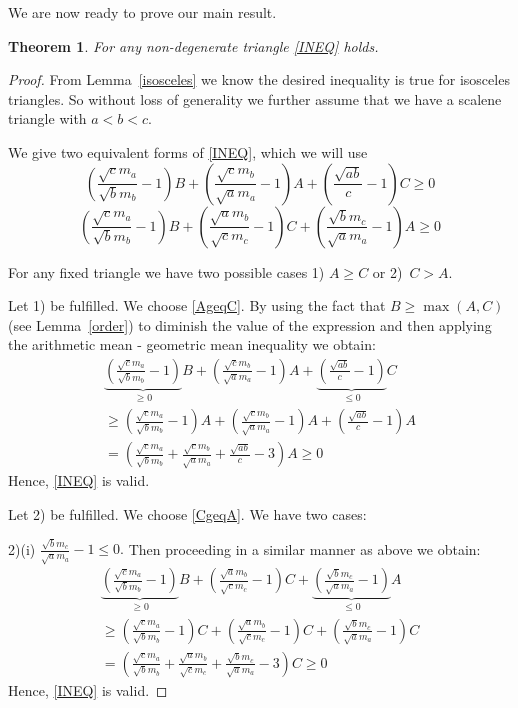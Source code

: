 \documentclass[a4paper,12pt]{article}
\newtheorem{theorem}{Theorem}
\begin{document}
We are now ready to prove our main result.
\begin{theorem}\label{scalenetriag} For any non-degenerate triangle \eqref{INEQ} holds.
\end{theorem}
\begin{proof}
From Lemma~\ref{isosceles} we know the desired inequality is true for isosceles triangles. So without loss of generality we further assume that we have a scalene triangle with $a<b<c.$

We give two equivalent forms of \eqref{INEQ}, which we will use 
\begin{equation}\label{AgeqC}
\left(\frac{\sqrt{c}m_a}{\sqrt{b}m_b}-1\right)B+\left(\frac{\sqrt{c}m_b}{\sqrt{a}m_a}-1\right)A+\left(\frac{\sqrt{ab}}{c}-1\right)C \geq 0
\end{equation}
\begin{equation}\label{CgeqA}
\left(\frac{\sqrt{c}m_a}{\sqrt{b}m_b}-1\right)B+\left(\frac{\sqrt{a}m_b}{\sqrt{c}m_c}-1\right)C+\left(\frac{\sqrt{b}m_c}{\sqrt{a}m_a}-1\right)A \geq 0
\end{equation}

For any fixed triangle we have two possible cases 1) $A \geq C$ or 2)~$C >A.$

Let 1) be fulfilled. We choose \eqref{AgeqC}. By using the fact that $B \geq \max(A,C)$ (see Lemma~\ref{order}) to diminish the value of the expression and then applying the arithmetic mean - geometric mean inequality we obtain:
\begin{align*}
\underbrace{\left(\frac{\sqrt{c}m_a}{\sqrt{b}m_b}-1\right)}_{\geq 0} B+\left(\frac{\sqrt{c}m_b}{\sqrt{a}m_a}-1\right)A+\underbrace{\left(\frac{\sqrt{ab}}{c}-1\right)}_{\leq 0}C\\
\geq \left(\frac{\sqrt{c}m_a}{\sqrt{b}m_b}-1\right)A+\left(\frac{\sqrt{c}m_b}{\sqrt{a}m_a}-1\right)A+\left(\frac{\sqrt{ab}}{c}-1\right)A \\
= \left(\frac{\sqrt{c}m_a}{\sqrt{b}m_b}+\frac{\sqrt{c}m_b}{\sqrt{a}m_a}+ \frac{\sqrt{ab}}{{c} }    -3\right)A \geq 0
\end{align*}
Hence, \eqref{INEQ} is valid.



Let 2) be fulfilled. We choose \eqref{CgeqA}. We have two cases:

2)(i) $\frac{\sqrt{b}m_c}{\sqrt{a}m_a}-1 \leq 0.$ Then proceeding in a similar manner as above we obtain:
\begin{align*}
\underbrace{\left(\frac{\sqrt{c}m_a}{\sqrt{b}m_b}-1\right)}_{\geq 0} B+\left(\frac{\sqrt{a}m_b}{\sqrt{c}m_c}-1\right)C+\underbrace{\left(\frac{\sqrt{b}m_c}{\sqrt{a}m_a}-1\right)}_{\leq 0}A\\
\geq \left(\frac{\sqrt{c}m_a}{\sqrt{b}m_b}-1\right)C+\left(\frac{\sqrt{a}m_b}{\sqrt{c}m_c}-1\right)C+\left(\frac{\sqrt{b}m_c}{\sqrt{a}m_a}-1\right)C\\
= \left(\frac{\sqrt{c}m_a}{\sqrt{b}m_b} + \frac{\sqrt{a}m_b}{\sqrt{c}m_c} +\frac{\sqrt{b}m_c}{\sqrt{a}m_a}-3\right)C \geq 0
\end{align*}
Hence, \eqref{INEQ} is valid.


\end{proof}
\end{document}
